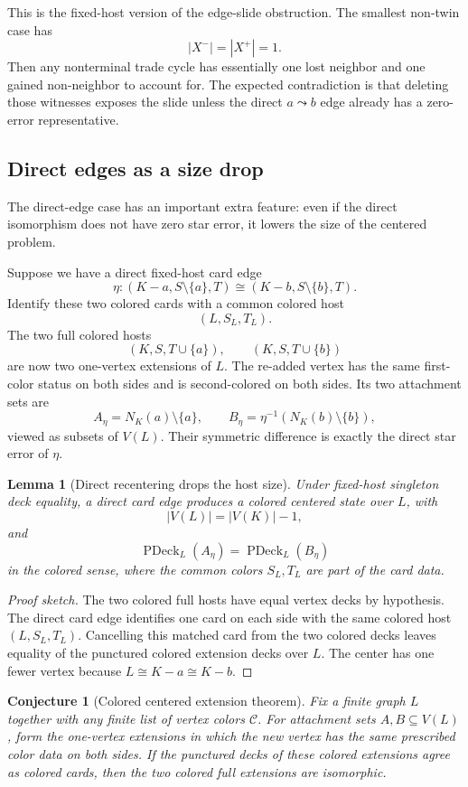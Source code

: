 \documentclass[11pt]{article}
\newtheorem{lemma}{Lemma}
\newtheorem{conjecture}{Conjecture}
\newcommand{\PDeck}{\operatorname{PDeck}}
\begin{document}
This is the fixed-host version of the edge-slide obstruction.  The smallest
non-twin case has
\[
  |X^-|=|X^+|=1.
\]
Then any nonterminal trade cycle has essentially one lost neighbor and one
gained non-neighbor to account for.  The expected contradiction is that
deleting those witnesses exposes the slide unless the direct \(a\leadsto b\)
edge already has a zero-error representative.

\subsection{Direct edges as a size drop}

The direct-edge case has an important extra feature: even if the direct
isomorphism does not have zero star error, it lowers the size of the centered
problem.

Suppose we have a direct fixed-host card edge
\[
  \eta:(K-a,S\setminus\{a\},T)
  \cong
  (K-b,S\setminus\{b\},T).
\]
Identify these two colored cards with a common colored host
\[
  (L,S_L,T_L).
\]
The two full colored hosts
\[
  (K,S,T\cup\{a\}),
  \qquad
  (K,S,T\cup\{b\})
\]
are now two one-vertex extensions of \(L\).  The re-added vertex has the same
first-color status on both sides and is second-colored on both sides.  Its
two attachment sets are
\[
  A_\eta=N_K(a)\setminus\{a\},
  \qquad
  B_\eta=\eta^{-1}(N_K(b)\setminus\{b\}),
\]
viewed as subsets of \(V(L)\).  Their symmetric difference is exactly the
direct star error of \(\eta\).

\begin{lemma}[Direct recentering drops the host size]
Under fixed-host singleton deck equality, a direct card edge produces a
colored centered state over \(L\), with
\[
  |V(L)|=|V(K)|-1,
\]
and
\[
  \PDeck_L(A_\eta)=\PDeck_L(B_\eta)
\]
in the colored sense, where the common colors \(S_L,T_L\) are part of the
card data.
\end{lemma}

\begin{proof}[Proof sketch]
The two colored full hosts have equal vertex decks by hypothesis.  The direct
card edge identifies one card on each side with the same colored host
\((L,S_L,T_L)\).  Cancelling this matched card from the two colored decks
leaves equality of the punctured colored extension decks over \(L\).  The
center has one fewer vertex because \(L\cong K-a\cong K-b\).
\end{proof}

\begin{conjecture}[Colored centered extension theorem]
Fix a finite graph \(L\) together with any finite list of vertex colors
\(\mathcal C\).  For attachment sets \(A,B\subseteq V(L)\), form the
one-vertex extensions in which the new vertex has the same prescribed color
data on both sides.  If the punctured decks of these colored extensions agree
as colored cards, then the two colored full extensions are isomorphic.
\end{conjecture}
\end{document}
